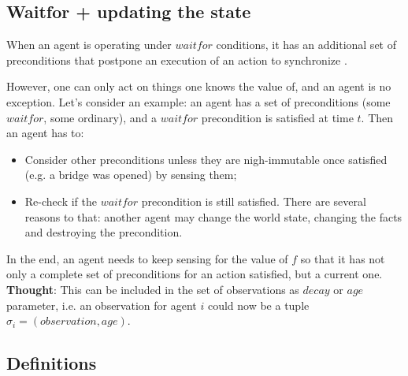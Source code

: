 \documentclass[fleqn,10pt]{olplainarticle}
\begin{document}
\subsection{Waitfor + updating the state}
When an agent is operating under $waitfor$ conditions, it has an additional set of preconditions that postpone an execution of an action to synchronize \cite{karpas_automated_2017}.

However, one can only act on things one knows the value of, and an agent is no exception.
Let's consider an example: an agent has a set of preconditions (some $waitfor$, some ordinary), and a $waitfor$ precondition is satisfied at time $t$. Then an agent has to:
\begin{itemize}
    \item Consider other preconditions unless they are nigh-immutable once satisfied (e.g. a bridge was opened) by sensing them;
    \item Re-check if the $waitfor$ precondition is still satisfied. There are several reasons to that: another agent may change the world state, changing the facts and destroying the precondition.
\end{itemize}

In the end, an agent needs to keep sensing for the value of $f$ so that it has not only a complete set of preconditions for an action satisfied, but a current one. 
\textbf{Thought}: This can be included in the set of observations as $decay$ or $age$ parameter, i.e. an observation for agent $i$ could now be a tuple $\sigma_i=(observation, age)$.
\subsection{Definitions}
\end{document}
